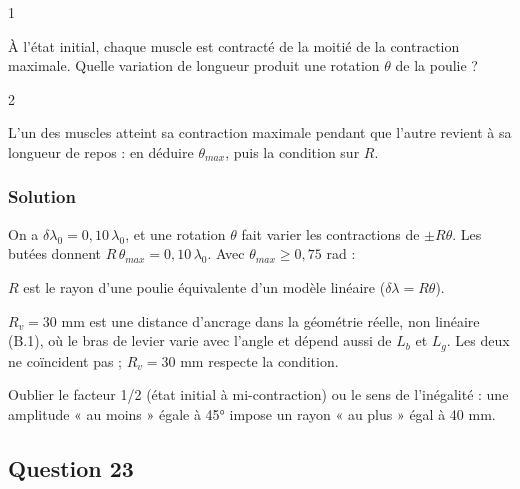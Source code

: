 \documentclass[11pt,a4paper]{article}
\newcommand{\equationajustee}[1]{%
  \sbox{\boiteequation}{$\displaystyle #1$}%
  \ifdim\wd\boiteequation>\linewidth
    \[\resizebox{\linewidth}{!}{\usebox{\boiteequation}}\]%
  \else
    \[#1\]%
  \fi}
\begin{document}
\begin{indication}{1}

À l'état initial, chaque muscle est contracté de la moitié de la contraction maximale. Quelle variation de longueur produit une rotation \(\theta\) de la poulie ?

\end{indication}

\begin{indication}{2}

L'un des muscles atteint sa contraction maximale pendant que l'autre revient à sa longueur de repos : en déduire \(\theta_{max}\), puis la condition sur \(R\).

\end{indication}

\hypertarget{solution-21}{%
\subsubsection{Solution}\label{solution-21}}

On a \(\delta\lambda_0=0{,}10\,\lambda_0\), et une rotation \(\theta\) fait varier les contractions de \(\pm R\theta\). Les butées donnent \(R\,\theta_{max}=0{,}10\,\lambda_0\). Avec \(\theta_{max}\ge0{,}75\) rad :

\equationajustee{\begin{aligned}
R&\le\frac{0{,}10\times0{,}30}{0{,}75}\\
&=0{,}04\ \mathrm m
\end{aligned}}

\equationajustee{\boxed{R\le40\ \mathrm{mm}}}

\(R\) est le rayon d'une poulie équivalente d'un modèle linéaire (\(\delta\lambda=R\theta\)).

\(R_v=30\) mm est une distance d'ancrage dans la géométrie réelle, non linéaire (B.1), où le bras de levier varie avec l'angle et dépend aussi de \(L_b\) et \(L_g\). Les deux ne coïncident pas ; \(R_v=30\) mm respecte la condition.

\begin{piege}

Oublier le facteur 1/2 (état initial à mi-contraction) ou le sens de l'inégalité : une amplitude « au moins » égale à 45° impose un rayon « au plus » égal à 40 mm.

\end{piege}

\hypertarget{question-23}{%
\subsection{Question 23}\label{question-23}}
\end{document}
